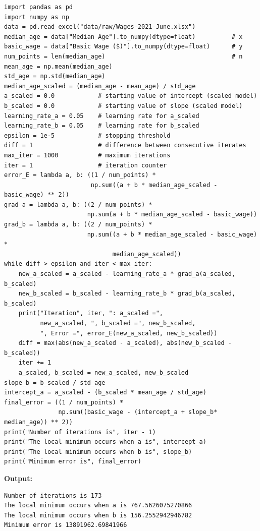 \documentclass[12pt,a4paper,oneside]{report}
\begin{document}
\begin{verbatim}
import pandas as pd
import numpy as np
data = pd.read_excel("data/raw/Wages-2021-June.xlsx")
median_age = data["Median Age"].to_numpy(dtype=float)          # x
basic_wage = data["Basic Wage ($)"].to_numpy(dtype=float)      # y
num_points = len(median_age)                                   # n
mean_age = np.mean(median_age)
std_age = np.std(median_age)
median_age_scaled = (median_age - mean_age) / std_age
a_scaled = 0.0            # starting value of intercept (scaled model)
b_scaled = 0.0            # starting value of slope (scaled model)
learning_rate_a = 0.05    # learning rate for a_scaled
learning_rate_b = 0.05    # learning rate for b_scaled
epsilon = 1e-5            # stopping threshold
diff = 1                  # difference between consecutive iterates
max_iter = 1000           # maximum iterations
iter = 1                  # iteration counter
error_E = lambda a, b: ((1 / num_points) *
                        np.sum((a + b * median_age_scaled - basic_wage) ** 2))
grad_a = lambda a, b: ((2 / num_points) *
                       np.sum(a + b * median_age_scaled - basic_wage))
grad_b = lambda a, b: ((2 / num_points) *
                       np.sum((a + b * median_age_scaled - basic_wage) *
                              median_age_scaled))
while diff > epsilon and iter < max_iter:
    new_a_scaled = a_scaled - learning_rate_a * grad_a(a_scaled, b_scaled)
    new_b_scaled = b_scaled - learning_rate_b * grad_b(a_scaled, b_scaled)
    print("Iteration", iter, ": a_scaled =",
          new_a_scaled, ", b_scaled =", new_b_scaled,
          ", Error =", error_E(new_a_scaled, new_b_scaled))
    diff = max(abs(new_a_scaled - a_scaled), abs(new_b_scaled - b_scaled))
    iter += 1
    a_scaled, b_scaled = new_a_scaled, new_b_scaled
slope_b = b_scaled / std_age
intercept_a = a_scaled - (b_scaled * mean_age / std_age)
final_error = ((1 / num_points) *
               np.sum((basic_wage - (intercept_a + slope_b* median_age)) ** 2))
print("Number of iterations is", iter - 1)
print("The local minimum occurs when a is", intercept_a)
print("The local minimum occurs when b is", slope_b)
print("Minimum error is", final_error)
\end{verbatim}

\textbf{Output:}
\begin{verbatim}
Number of iterations is 173
The local minimum occurs when a is 767.5626075270866
The local minimum occurs when b is 156.2552942946782
Minimum error is 13891962.69841966
\end{verbatim}
\end{document}
